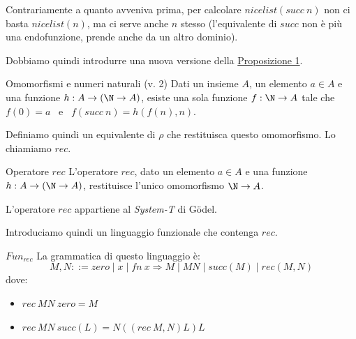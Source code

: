 \documentclass[a4paper,11pt]{report}
\begin{document}

Contrariamente a quanto avveniva prima, per calcolare \( nicelist(succ \ n) \) non ci basta \( nicelist(n) \), ma ci serve anche \( n \) stesso (l'equivalente di \( succ \) non è più una endofunzione, prende anche da un altro dominio).

Dobbiamo quindi introdurre una nuova versione della \hyperref[prop1]{Proposizione 1}.

\begin{propframe}{Omomorfismi e numeri naturali (v. 2)}{}
    Dati un insieme \( A \), un elemento \( a \in A \) e una funzione \( h: A \to (\N \to A) \), esiste una sola funzione \( f: \N \to A \) tale che \( f(0) = a \) \ e \ \( f(succ \ n) = h(f(n), n) \).
\end{propframe}

Definiamo quindi un equivalente di \( \rho \) che restituisca questo omomorfismo. Lo chiamiamo \( rec \).

\begin{defframe}{Operatore \( rec \)}{}
    L'operatore \( rec \), dato un elemento \( a \in A \) e una funzione \( h: A \to (\N \to A) \), restituisce l'unico omomorfismo \( \N \to A \).
\end{defframe}

L'operatore \( rec \) appartiene al \textit{System-T} di Gödel.

Introduciamo quindi un linguaggio funzionale che contenga \( rec \).

\begin{defframe}{\( Fun_{rec} \)}{}
    La grammatica di questo linguaggio è:
    \[
        M, N ::= zero \mid x \mid fn \ x \Rightarrow M \mid MN \mid succ(M) \mid rec(M, N)
    \]
    dove:
    \begin{itemize}
        \item \( rec \ MN \ zero = M \)
        \item \( rec \ MN \ succ(L) = N((rec \ M,N)L)L \) 
    \end{itemize}
\end{defframe}
\end{document}
